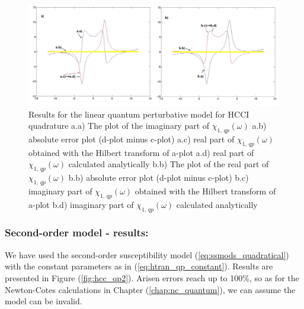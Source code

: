\documentclass[12pt,twoside,a4paper]{article}
\numberwithin{equation}{subsection}
\numberwithin{figure}{subsection}
\begin{document}
\begin{figure}
  \includegraphics[width=150mm]{img/hcc_qp1.png}
  \caption{Results for the linear quantum perturbative model for HCCI quadrature
    a.a) The plot of the imaginary part of ${\chi_{1, \, qp}}(\omega )$
    a.b) absolute error plot (d-plot minus c-plot) 
    a.c) real part of ${\chi_{1, \, qp}}(\omega )$ obtained with the Hilbert transform of a-plot 
    a.d) real part of ${\chi_{1, \, qp}}(\omega )$ calculated analytically 
    b.b) The plot of the real part of ${\chi_{1, \, qp}}(\omega )$ 
    b.b) absolute error plot (d-plot minus c-plot) 
    b.c) imaginary part of ${\chi_{1, \, qp}}(\omega )$ obtained with the Hilbert transform of a-plot 
    b.d) imaginary part of ${\chi_{1, \, qp}}(\omega )$ calculated analytically  
    \label{fig:hcc_qp1}
  }
\end{figure}

\subsubsection*{Second-order model - results:}

We have used the second-order susceptibility model (\ref{eq:ssmods_quadratical}) with the constant parameters as in (\ref{eq:htran_qp_constant}). Results are presented in Figure (\ref{fig:hcc_qp2}). Arisen errors reach up to 100\%, so as for the Newton-Cotes calculations in Chapter (\ref{chap:nc_quantum}), we can assume the model can be invalid.
\end{document}
